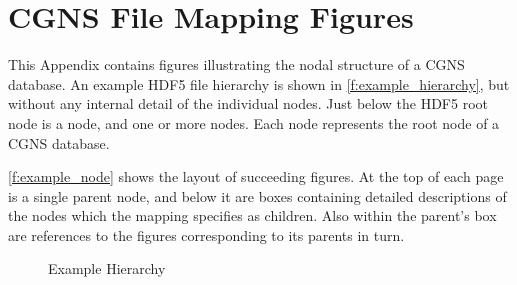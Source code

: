 \section{CGNS File Mapping Figures}
\label{s:figures}
\thispagestyle{plain}

This Appendix contains figures illustrating the nodal structure of
a CGNS database.
An example HDF5 file hierarchy is shown in \autoref{f:example_hierarchy},
but without any internal detail of the individual nodes.
Just below the HDF5 root node is a  node, and
one or more  nodes.
Each  node represents the root node of a CGNS database.

\autoref{f:example_node} shows the layout of succeeding figures.
At the top of each page is a single parent node, and below it are boxes
containing detailed descriptions of the nodes which the mapping specifies
as children.
Also within the parent's box are references to the figures corresponding
to its parents in turn.

\renewcommand{\topfraction}{1.00}
\renewcommand{\bottomfraction}{1.00}
\renewcommand{\textfraction}{0.0}
\setlength{\unitlength}{1em}	%

\newlength{\indName}
\newlength{\indLabel}
\newlength{\indDimensions}
\newlength{\indDimensionValues}
\newlength{\indData}
\newlength{\indParameters}
\newlength{\indFunctions}
\newlength{\indChildNodes}
\newlength{\indbullet}
\newlength{\spacea}
\newlength{\spaceb}
\newlength{\spacec}
\settowidth{\indbullet}{\textbullet ~~}
\setlength{\spacea}{\indDimensionValues-\indChildNodes}
\setlength{\spaceb}{\indDimensions-\indParameters+5em}
\setlength{\spacec}{\indDimensions-\indFunctions+5em}

\newlength{\textmcap}
\setlength{\textmcap}{\textheight-\abovecaptionskip-\baselineskip}

\begin{landscape}
\begin{figure}[!htp]
\centering
\resizebox{\linewidth}{!}{}
\caption{Example Hierarchy}
\label{f:example_hierarchy}
\end{figure}
\end{landscape}

